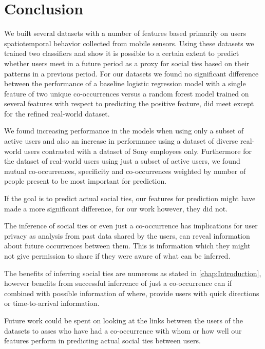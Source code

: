 \chapter{Conclusion}
\label{chap:conclusion}
We built several datasets with a number of features based primarily on users spatiotemporal behavior collected from mobile sensors. Using these datasets we trained two classifiers and show it is possible to a certain extent to predict whether users meet in a future period as a proxy for social ties based on their patterns in a previous period. For our datasets we found no significant difference between the performance of a baseline logistic regression model with a single feature of two unique co-occurrences versus a random forest model trained on several features with respect to predicting the positive feature, did meet except for the refined real-world dataset.

We found increasing performance in the models when using only a subset of active users and also an increase in performance using a dataset of diverse real-world users contrasted with a dataset of Sony employees only. Furthermore for the dataset of real-world users using just a subset of active users, we found mutual co-occurrences, specificity and co-occurrences weighted by number of people present to be most important for prediction.

If the goal is to predict actual social ties, our features for prediction might have made a more significant difference, for our work however, they did not.

The inference of social ties or even just a co-occurrence has implications for user privacy as analysis from past data shared by the users, can reveal information about future occurrences between them. This is information which they might not give permission to share if they were aware of what can be inferred.

The benefits of inferring social ties are numerous as stated in \autoref{chap:Introduction}, however benefits from successful inferrence of just a co-occurrence can if combined with possible information of where, provide users with quick directions or time-to-arrival information.

Future work could be spent on looking at the links between the users of the datasets to asses who have had a co-occurrence with whom or how well our features perform in predicting actual social ties between users.